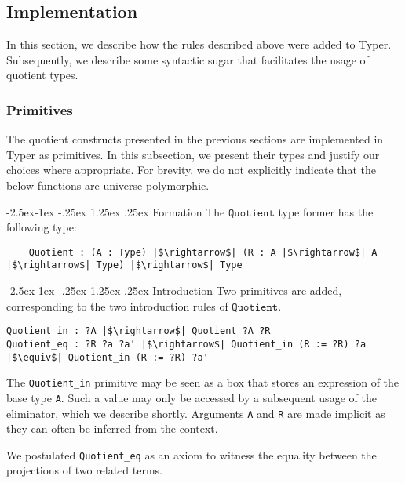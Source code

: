 \documentclass[12pt,twoside,maitrise]{dms}
\makeatletter
\theoremstyle{definition}
\numberwithin{equation}{section}
\numberwithin{table}{chapter}
\numberwithin{figure}{chapter}
\newcommand\id[1] {\texttt{#1}}
\renewcommand\paragraph{\@startsection{paragraph}{4}{\z@}%
            {-2.5ex\@plus -1ex \@minus -.25ex}%
            {1.25ex \@plus .25ex}%
            {\normalfont\normalsize\bfseries}}
\makeatother
\begin{document}
\subsection{Implementation}

In this section, we describe how the rules described above were added to Typer.
Subsequently, we describe some syntactic sugar that facilitates the usage of
quotient types.

\subsubsection{Primitives}

The quotient constructs presented in the previous sections are implemented in
Typer as primitives. In this subsection, we present their types and justify our
choices where appropriate. For brevity, we do not explicitly indicate that the
below functions are universe polymorphic.

\paragraph{Formation}
The $\id{Quotient}$ type former has the following type:

\begin{verbatim}
    Quotient : (A : Type) |$\rightarrow$| (R : A |$\rightarrow$| A |$\rightarrow$| Type) |$\rightarrow$| Type
\end{verbatim}

\paragraph{Introduction}
Two primitives are added, corresponding to the two introduction rules of $\id{Quotient}$.

\begin{verbatim}
Quotient_in : ?A |$\rightarrow$| Quotient ?A ?R
Quotient_eq : ?R ?a ?a' |$\rightarrow$| Quotient_in (R := ?R) ?a |$\equiv$| Quotient_in (R := ?R) ?a'
\end{verbatim}

The \id{Quotient\_in} primitive may be seen as a box that stores an expression
of the base type \id{A}. Such a value may only be accessed by a subsequent usage
of the eliminator, which we describe shortly. Arguments \id{A} and \id{R} are
made implicit as they can often be inferred from the context.

We postulated \id{Quotient\_eq} as an axiom to witness the equality between the
projections of two related terms.
\end{document}
